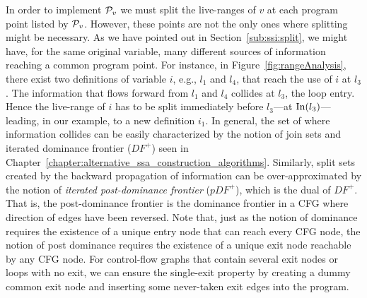 {In order to implement ${\cal P}_v$ we must split the live-ranges of $v$ at each
program point listed by ${\cal P}_v$.
However, these points are not the only ones where splitting might be
necessary.
As we have pointed out in Section~\ref{sub:ssi:split}, we might have, for the same original variable, many different sources of information reaching a common program point.
For instance, in Figure~\ref{fig:rangeAnalysis}, there exist two definitions of variable $i$, e.g., $l_1$ and $l_4$, that reach the use of $i$ at $l_3$.
The information that flows forward from $l_1$ and $l_4$ collides at $l_3$, the loop entry.
Hence the live-range of $i$ has to be split immediately before $l_3$---at $\textrm{In}(l_3)$---leading, in our example, to a new definition $i_1$.
In general, the set of \progpoints where information collides can be easily
characterized by the notion of join sets and iterated dominance frontier ($\textit{DF}^+$) seen in Chapter~\ref{chapter:alternative_ssa_construction_algorithms}.
Similarly, split sets created by the backward propagation of information can be over-approximated by the notion of {\em iterated post-dominance frontier} ($\textit{pDF}^+$), which is the dual of $\textit{DF}^+$.
That is, the post-dominance frontier is the dominance frontier in a CFG where direction of edges have been reversed.
Note that, just as the notion of dominance requires the existence of a unique entry node that can reach every CFG node, the notion of post dominance requires the existence of a unique exit node reachable by any CFG node.
For control-flow graphs that contain several exit nodes or loops with no exit, we can ensure the single-exit property by creating a dummy common exit node and inserting some never-taken exit edges into the program.

}
